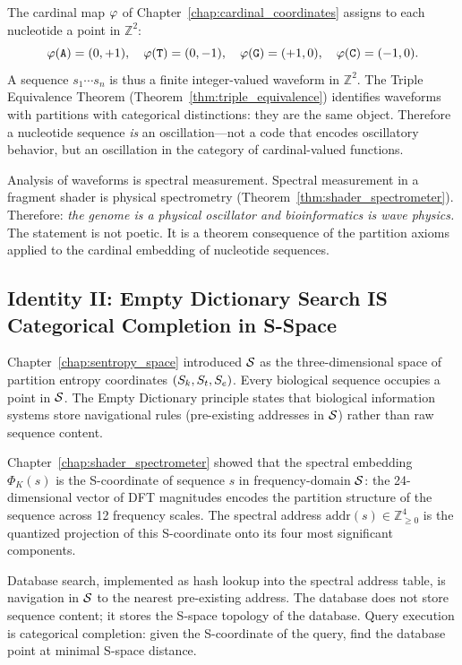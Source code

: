 The cardinal map $\varphi$ of Chapter~\ref{chap:cardinal_coordinates}
assigns to each nucleotide a point in $\mathbb{Z}^2$:
\[
  \varphi(\mathtt{A}) = (0,+1),\quad \varphi(\mathtt{T}) = (0,-1),\quad
  \varphi(\mathtt{G}) = (+1,0),\quad \varphi(\mathtt{C}) = (-1,0).
\]
A sequence $s_1\cdots s_n$ is thus a finite integer-valued waveform in $\mathbb{Z}^2$.
The Triple Equivalence Theorem (Theorem~\ref{thm:triple_equivalence}) identifies
waveforms with partitions with categorical distinctions: they are the same
object. Therefore a nucleotide sequence \emph{is} an oscillation---not a code
that encodes oscillatory behavior, but an oscillation in the category of
cardinal-valued functions.

Analysis of waveforms is spectral measurement. Spectral measurement in a fragment
shader is physical spectrometry (Theorem~\ref{thm:shader_spectrometer}).
Therefore: \emph{the genome is a physical oscillator and bioinformatics is wave
physics.} The statement is not poetic. It is a theorem consequence of the
partition axioms applied to the cardinal embedding of nucleotide sequences.

\subsection{Identity II: Empty Dictionary Search IS Categorical Completion in S-Space}
\label{subsec:identity_II}

Chapter~\ref{chap:sentropy_space} introduced $\mathcal{S}$ as the three-dimensional
space of partition entropy coordinates $(S_k, S_t, S_e)$. Every biological
sequence occupies a point in $\mathcal{S}$. The Empty Dictionary principle states
that biological information systems store navigational rules (pre-existing
addresses in $\mathcal{S}$) rather than raw sequence content.

Chapter~\ref{chap:shader_spectrometer} showed that the spectral embedding
$\Phi_K(s)$ is the S-coordinate of sequence $s$ in frequency-domain $\mathcal{S}$:
the 24-dimensional vector of DFT magnitudes encodes the partition structure of
the sequence across 12 frequency scales. The spectral address
$\mathrm{addr}(s) \in \mathbb{Z}_{\geq 0}^4$ is the quantized projection of
this S-coordinate onto its four most significant components.

Database search, implemented as hash lookup into the spectral address table,
is navigation in $\mathcal{S}$ to the nearest pre-existing address. The database
does not store sequence content; it stores the S-space topology of the database.
Query execution is categorical completion: given the S-coordinate of the query,
find the database point at minimal S-space distance.

